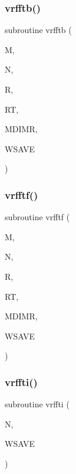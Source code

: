 \mbox{\label{sfft_8f_a3d6b11e474dd9bb984ac4054ddab2c34}} 
\subsubsection{\texorpdfstring{vrfftb()}{vrfftb()}}
{\footnotesize\ttfamily subroutine vrfftb (\begin{DoxyParamCaption}\item[{}]{M,  }\item[{}]{N,  }\item[{dimension(mdimr,n)}]{R,  }\item[{dimension(mdimr,n)}]{RT,  }\item[{}]{M\+D\+I\+MR,  }\item[{dimension(n+15)}]{W\+S\+A\+VE }\end{DoxyParamCaption})}

\mbox{\label{sfft_8f_a12a99635a0a55f46d7332f7edf41fecb}} 
\subsubsection{\texorpdfstring{vrfftf()}{vrfftf()}}
{\footnotesize\ttfamily subroutine vrfftf (\begin{DoxyParamCaption}\item[{}]{M,  }\item[{}]{N,  }\item[{dimension(mdimr,n)}]{R,  }\item[{dimension(mdimr,n)}]{RT,  }\item[{}]{M\+D\+I\+MR,  }\item[{dimension(n+15)}]{W\+S\+A\+VE }\end{DoxyParamCaption})}

\mbox{\label{sfft_8f_a5c99760521da8176c787bb9c97496a52}} 
\subsubsection{\texorpdfstring{vrffti()}{vrffti()}}
{\footnotesize\ttfamily subroutine vrffti (\begin{DoxyParamCaption}\item[{}]{N,  }\item[{dimension(n+15)}]{W\+S\+A\+VE }\end{DoxyParamCaption})}

